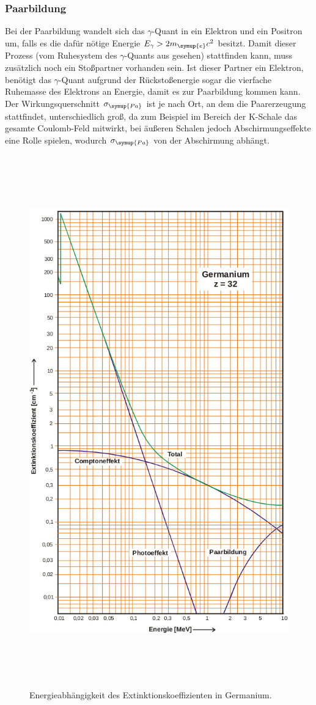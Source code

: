 \subsubsection{Paarbildung}
Bei der Paarbildung wandelt sich das $\gamma$-Quant in ein Elektron und ein Positron um, falls es die dafür nötige Energie $E_{\gamma}>2m_{\symup{e}}c^2$ besitzt.
Damit dieser Prozess (vom Ruhesystem des $\gamma$-Quants aus gesehen) stattfinden kann, muss zusätzlich noch ein Stoßpartner vorhanden sein.
Ist dieser Partner ein Elektron, benötigt das $\gamma$-Quant aufgrund der Rückstoßenergie sogar die vierfache Ruhemasse des Elektrons an Energie, damit es zur Paarbildung kommen kann.
Der Wirkungsquerschnitt $\sigma_{\symup{Pa}}$ ist je nach Ort, an dem die Paarerzeugung stattfindet, unterschiedlich groß, da zum Beispiel im Bereich der K-Schale das gesamte Coulomb-Feld mitwirkt, bei äußeren Schalen
jedoch Abschirmungseffekte eine Rolle spielen, wodurch $\sigma_{\symup{Pa}}$ von der Abschirmung abhängt.
 \begin{figure}
   \centering
   \includegraphics[height=23cm]{content/pictures/Germanium.png}
   \caption{Energieabhängigkeit des Extinktionskoeffizienten in Germanium.\cite{V18}}
   \label{fig:Germanium}
 \end{figure}

